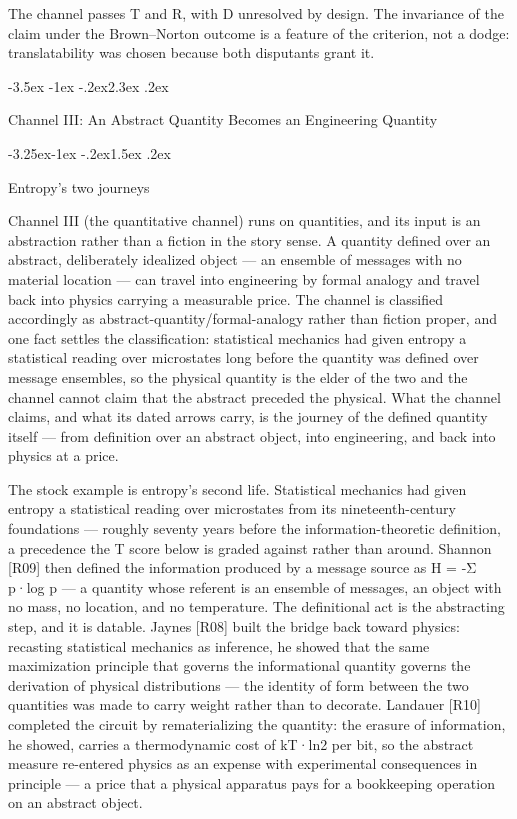 \documentclass[11pt,a4paper]{article}
\makeatletter
\renewcommand\section{\@startsection{section}{1}{\z@}%
  {-3.5ex \@plus -1ex \@minus -.2ex}{2.3ex \@plus .2ex}%
  {\normalfont\Large\bfseries\raggedright}}
\renewcommand\subsection{\@startsection{subsection}{2}{\z@}%
  {-3.25ex\@plus -1ex \@minus -.2ex}{1.5ex \@plus .2ex}%
  {\normalfont\large\bfseries\raggedright}}
\makeatother
\begin{document}
The channel passes T and R, with D unresolved by design. The invariance of the claim under the Brown–Norton outcome is a feature of the criterion, not a dodge: translatability was chosen because both disputants grant it.

\section{Channel III: An Abstract Quantity Becomes an Engineering Quantity}

\subsection{Entropy's two journeys}

Channel III (the quantitative channel) runs on quantities, and its input is an abstraction rather than a fiction in the story sense. A quantity defined over an abstract, deliberately idealized object — an ensemble of messages with no material location — can travel into engineering by formal analogy and travel back into physics carrying a measurable price. The channel is classified accordingly as abstract-quantity/formal-analogy rather than fiction proper, and one fact settles the classification: statistical mechanics had given entropy a statistical reading over microstates long before the quantity was defined over message ensembles, so the physical quantity is the elder of the two and the channel cannot claim that the abstract preceded the physical. What the channel claims, and what its dated arrows carry, is the journey of the defined quantity itself — from definition over an abstract object, into engineering, and back into physics at a price.

The stock example is entropy's second life. Statistical mechanics had given entropy a statistical reading over microstates from its nineteenth-century foundations — roughly seventy years before the information-theoretic definition, a precedence the T score below is graded against rather than around. Shannon [R09] then defined the information produced by a message source as H = -Σ p·log p — a quantity whose referent is an ensemble of messages, an object with no mass, no location, and no temperature. The definitional act is the abstracting step, and it is datable. Jaynes [R08] built the bridge back toward physics: recasting statistical mechanics as inference, he showed that the same maximization principle that governs the informational quantity governs the derivation of physical distributions — the identity of form between the two quantities was made to carry weight rather than to decorate. Landauer [R10] completed the circuit by rematerializing the quantity: the erasure of information, he showed, carries a thermodynamic cost of kT·ln2 per bit, so the abstract measure re-entered physics as an expense with experimental consequences in principle — a price that a physical apparatus pays for a bookkeeping operation on an abstract object.
\end{document}

